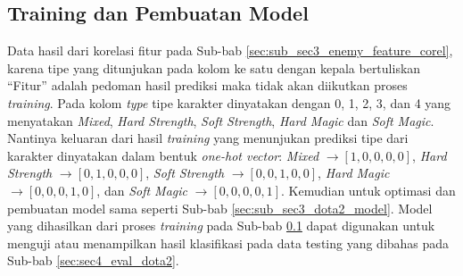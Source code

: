 \subsection{Training dan Pembuatan Model}
\label{sec:sub_sec3_enemy_char_train}
\vspace{1ex}

Data hasil dari korelasi fitur pada Sub-bab \ref{sec:sub_sec3_enemy_feature_corel}, karena tipe yang ditunjukan pada kolom ke satu dengan kepala bertuliskan ``Fitur'' adalah pedoman hasil prediksi maka tidak akan diikutkan proses \textit{training}. Pada kolom \textit{type} tipe karakter dinyatakan dengan 0, 1, 2, 3, dan 4 yang menyatakan \textit{Mixed}, \textit{Hard Strength}, \textit{Soft Strength}, \textit{Hard Magic} dan \textit{Soft Magic}. Nantinya keluaran dari hasil \textit{training} yang menunjukan prediksi tipe dari karakter dinyatakan dalam bentuk \textit{one-hot vector}: \textit{Mixed} $\rightarrow [1, 0, 0, 0, 0]$, \textit{Hard Strength} $\rightarrow [0, 1, 0, 0, 0]$, \textit{Soft Strength} $\rightarrow [0, 0, 1, 0, 0]$, \textit{Hard Magic} $\rightarrow [0, 0, 0, 1, 0]$, dan \textit{Soft Magic} $\rightarrow [0, 0, 0, 0, 1]$. Kemudian untuk optimasi dan pembuatan model sama seperti Sub-bab \ref{sec:sub_sec3_dota2_model}. Model yang dihasilkan dari proses \textit{training} pada Sub-bab \ref{sec:sub_sec3_enemy_char_train} dapat digunakan untuk menguji atau menampilkan hasil klasifikasi pada data testing yang dibahas pada Sub-bab \ref{sec:sec4_eval_dota2}.
\vspace{1ex}